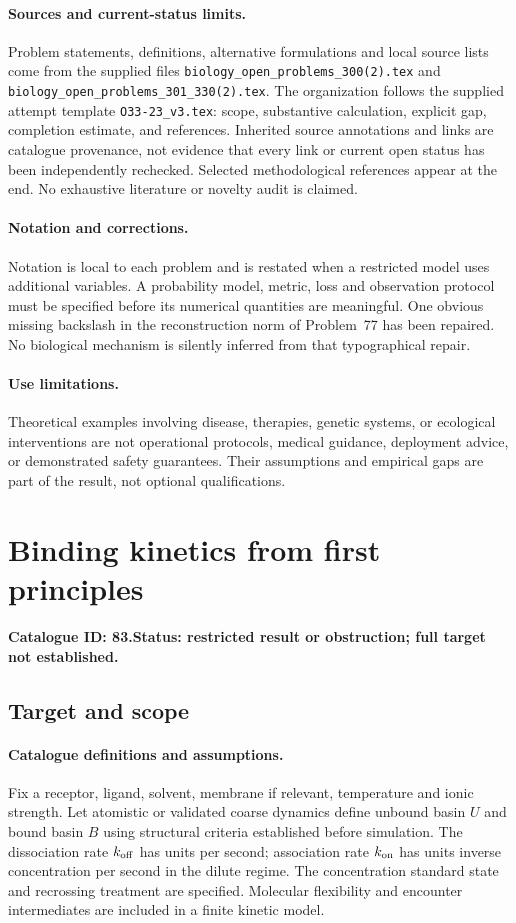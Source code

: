 \documentclass[11pt]{article}
\begin{document}
\paragraph{Sources and current-status limits.}
Problem statements, definitions, alternative formulations and local source lists
come from the supplied files
\texttt{biology\_open\_problems\_300(2).tex} and
\texttt{biology\_open\_problems\_301\_330(2).tex}.
The organization follows the supplied attempt template
\texttt{O33-23\_v3.tex}: scope, substantive calculation, explicit gap,
completion estimate, and references. Inherited source annotations and links are
catalogue provenance, not evidence that every link or current open status has
been independently rechecked. Selected methodological references appear at the
end. No exhaustive literature or novelty audit is claimed.

\paragraph{Notation and corrections.}
Notation is local to each problem and is restated when a restricted model uses
additional variables. A probability model, metric, loss and observation protocol
must be specified before its numerical quantities are meaningful. One obvious
missing backslash in the reconstruction norm of Problem~77 has been repaired.
No biological mechanism is silently inferred from that typographical repair.

\paragraph{Use limitations.}
Theoretical examples involving disease, therapies, genetic systems, or ecological
interventions are not operational protocols, medical guidance, deployment advice,
or demonstrated safety guarantees. Their assumptions and empirical gaps are part
of the result, not optional qualifications.

\setcounter{section}{82}
\section{Binding kinetics from first principles}
\label{prob:083}
\noindent\textbf{Catalogue ID: 83.}\quad \textbf{Status: restricted result or obstruction; full target not established.}
\subsection{Target and scope}
\paragraph{Catalogue definitions and assumptions.}
Fix a receptor, ligand, solvent, membrane if relevant, temperature and ionic strength. Let atomistic or validated coarse dynamics define unbound basin $U$ and bound basin $B$ using structural criteria established before simulation. The dissociation rate $k_{\rm off}$ has units per second; association rate $k_{\rm on}$ has units inverse concentration per second in the dilute regime. The concentration standard state and recrossing treatment are specified. Molecular flexibility and encounter intermediates are included in a finite kinetic model.
\end{document}
